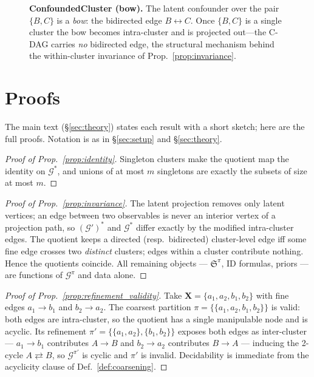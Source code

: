 \documentclass{article}
\newcommand{\Gq}{\mathcal{G}^{\pi}}
\newcommand{\Gg}{\mathcal{G}}
\newcommand{\ESpi}{\mathfrak{S}^{\pi}}
\begin{document}
\begin{figure}[ht]
  \centering
  \caption{\textbf{ConfoundedCluster (bow).} The latent confounder over the pair
  $\{B,C\}$ is a \emph{bow}: the bidirected edge $B\leftrightarrow C$. Once
  $\{B,C\}$ is a single cluster the bow becomes intra-cluster and is projected
  out---the C-DAG carries \emph{no} bidirected edge, the structural mechanism
  behind the within-cluster invariance of Prop.~\ref{prop:invariance}.}
  \label{fig:dag-confounded}
\end{figure}


\section{Proofs}
\label{app:proofs}

The main text (\S\ref{sec:theory}) states each result with a short sketch;
here are the full proofs. Notation is as in \S\ref{sec:setup} and
\S\ref{sec:theory}.

\begin{proof}[Proof of Prop.~\ref{prop:identity}]
Singleton clusters make the quotient map the identity on $\Gg^{*}$, and
unions of at most $m$ singletons are exactly the subsets of size at most
$m$.
\end{proof}

\begin{proof}[Proof of Prop.~\ref{prop:invariance}]
The latent projection removes only latent vertices; an edge between two
observables is never an interior vertex of a projection path, so
$(\Gg')^{*}$ and $\Gg^{*}$ differ exactly by the modified intra-cluster
edges. The quotient keeps a directed (resp.\ bidirected) cluster-level
edge iff some fine edge crosses two \emph{distinct} clusters; edges within
a cluster contribute nothing. Hence the quotients coincide. All remaining
objects --- $\ESpi$, ID formulas, priors --- are functions of $\Gq$ and
data alone.
\end{proof}

\begin{proof}[Proof of Prop.~\ref{prop:refinement_validity}]
Take $\mathbf{X}=\{a_1,a_2,b_1,b_2\}$ with fine edges $a_1\to b_1$ and
$b_2\to a_2$. The coarsest partition $\pi=\{\{a_1,a_2,b_1,b_2\}\}$ is valid:
both edges are intra-cluster, so the quotient has a single manipulable node
and is acyclic. Its refinement $\pi'=\{\{a_1,a_2\},\{b_1,b_2\}\}$ exposes both
edges as inter-cluster --- $a_1\to b_1$ contributes $A\to B$ and $b_2\to a_2$
contributes $B\to A$ --- inducing the 2-cycle $A\rightleftarrows B$, so
$\mathcal{G}^{\pi'}$ is cyclic and $\pi'$ is invalid. Decidability is immediate
from the acyclicity clause of Def.~\ref{def:coarsening}.
\end{proof}
\end{document}
